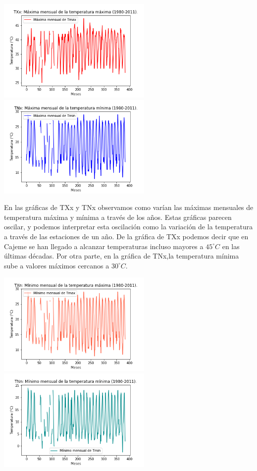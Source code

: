 \documentclass[letterpaper,12pt]{article}
\begin{document}
\begin{center}
	\includegraphics[height=5cm]{grafica5.png}\hspace*{\fill}
	\label{graf5}
   \includegraphics[height=5cm]{grafica6.png}
    \label{graf6}
\end{center}

En las gráficas de TXx y TNx observamos como varían las máximas mensuales de temperatura máxima y mínima a través de los años. Estas gráficas parecen oscilar, y podemos interpretar esta oscilación como la variación de la temperatura a través de las estaciones de un año. De la gráfica de TXx podemos decir que en Cajeme se han llegado a alcanzar temperaturas incluso mayores a $45^\circ C$ en las últimas décadas.
Por otra parte, en la gráfica de TNx,la temperatura mínima sube a valores máximos cercanos a  $30^\circ C$. 


\begin{center}
	\includegraphics[height=5cm]{grafica7.png}\hspace*{\fill}
	\label{graf7}
   \includegraphics[height=5cm]{grafica8.png}
    \label{graf8}
\end{center}
\end{document}
